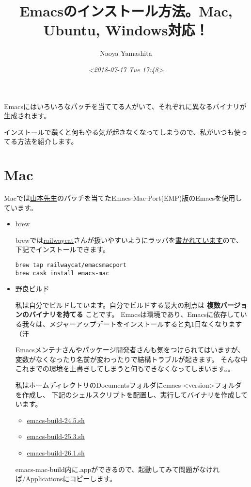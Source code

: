 \documentclass[11pt]{article}
\author{Naoya Yamashita}
\date{\textit{<2018-07-17 Tue 17:48>}}
\title{Emacsのインストール方法。Mac, Ubuntu, Windows対応！}
\begin{document}
\maketitle
\tableofcontents

Emacsにはいろいろなパッチを当ててる人がいて、それぞれに異なるバイナリが生成されます。

インストールで躓くと何もやる気が起きなくなってしまうので、私がいつも使ってる方法を紹介します。
\section{Mac}
\label{sec:orgb57ff47}
Macでは\href{https://nrid.nii.ac.jp/ja/nrid/1000000291295/}{山本先生}のパッチを当てたEmacs-Mac-Port(EMP)版のEmacsを使用しています。
\begin{itemize}
\item brew

brewでは\href{https://github.com/railwaycat}{railwaycat}さんが扱いやすいようにラッパを\href{https://github.com/railwaycat/homebrew-emacsmacport}{書かれています}ので、下記でインストールできます。
\begin{verbatim}
brew tap railwaycat/emacsmacport
brew cask install emacs-mac
\end{verbatim}
\item 野良ビルド

私は自分でビルドしています。自分でビルドする最大の利点は \textbf{複数バージョンのバイナリを持てる} ことです。
Emacsは環境であり、Emacsに依存している我々は、メジャーアップデートをインストールすると丸1日なくなります（汗

Emacsメンテナさんやパッケージ開発者さんも気をつけられてはいますが、変数がなくなったり名前が変わったりで結構トラブルが起きます。
そんな中これまでの環境を上書きしてしまうと何もできなくなってしまいます。。

私はホームディレクトリのDocumentsフォルダにemacs-<version>フォルダを作成し、
下記のシェルスクリプトを配置し、実行してバイナリを作成しています。
\begin{itemize}
\item \href{https://gist.github.com/conao/5529d711a97a8062e4e9298456834be3}{emacs-build-24.5.sh}
\item \href{https://gist.github.com/conao/139179f8d7fead3e53508a8b13fbfc9f}{emacs-build-25.3.sh}
\item \href{https://gist.github.com/conao/38ee583916857f0a69bc3f4137dbd5cf}{emacs-build-26.1.sh}
\end{itemize}
emacs-mac-build内に.appができるので、起動してみて問題がなければ/Applicationsにコピーします。


\end{itemize}
\end{document}
